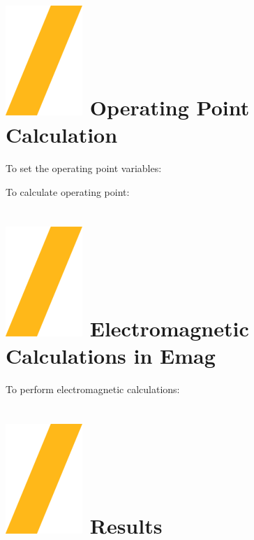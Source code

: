 \documentclass[landscape]{article}
\begin{document}
\begin{multicols}{3}
\section{\includegraphics[height=\fontcharht\font`\S]{slash.png} Operating Point Calculation}
To set the operating point variables:

To calculate operating point:

\section{\includegraphics[height=\fontcharht\font`\S]{slash.png} Electromagnetic Calculations in Emag}
To perform electromagnetic calculations:

\section{\includegraphics[height=\fontcharht\font`\S]{slash.png} Results}


\end{multicols}
\end{document}
